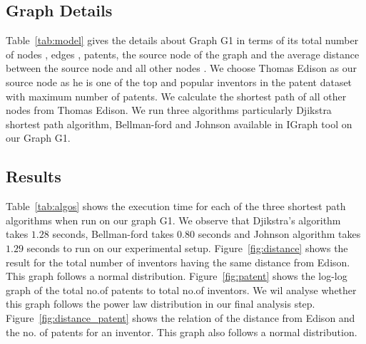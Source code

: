 \subsection{Graph Details}
Table~\ref{tab:model} gives the details about Graph G1 in
terms of its total number of nodes , edges , patents, the source node  of the graph
and the average distance between the source node and all other nodes .  
 We choose Thomas Edison as our source node
as he is one of the top and popular inventors in the patent dataset with maximum number of patents.
We calculate the shortest path of all other nodes from Thomas Edison. 
We run three algorithms particularly Djikstra shortest path algorithm, Bellman-ford and Johnson 
available in IGraph tool on our Graph G1. 

\subsection{Results}
Table~\ref{tab:algos} shows the execution time for each of the three shortest path algorithms 
when run on our graph G1. We observe that Djikstra's algorithm takes $1.28$ seconds, Bellman-ford takes
$0.80$ seconds and Johnson algorithm takes $1.29$ seconds to run on our experimental setup.
Figure~\ref{fig:distance} shows the result for the total number of inventors having the same
distance from Edison. This graph follows a normal distribution. Figure~\ref{fig:patent} shows the log-log graph of the total no.of patents
to total no.of inventors. We wil analyse whether this graph follows the power law distribution in our 
final analysis step. Figure~\ref{fig:distance_patent} shows the relation of the distance from Edison and
the no. of patents for an inventor. This graph also follows a normal distribution.

